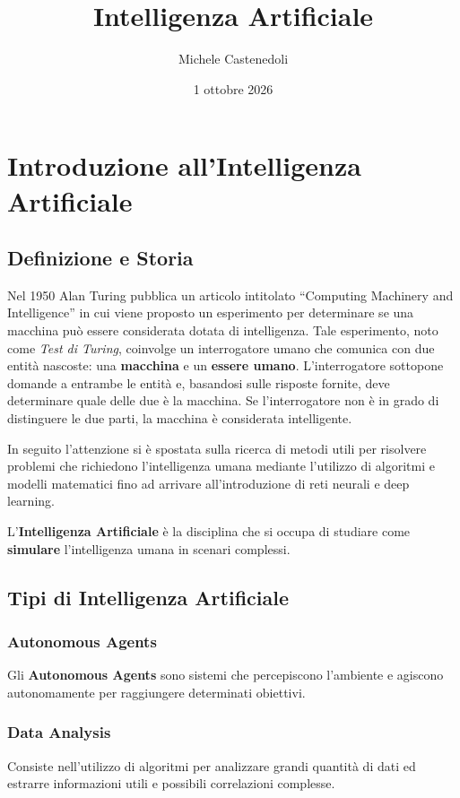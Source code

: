 \documentclass[a4paper, 11pt, oneside]{book}
\title{Intelligenza Artificiale}
\author{Michele Castenedoli}
\date{1 ottobre 2026}
\theoremstyle{definition}
\begin{document}
	\maketitle

	\tableofcontents

	\chapter{Introduzione all'Intelligenza Artificiale}
	\section{Definizione e Storia}
	Nel 1950 Alan Turing pubblica un articolo intitolato ``Computing Machinery and
	Intelligence'' in cui viene proposto un esperimento per determinare se una
	macchina pu\`o essere considerata dotata di intelligenza. Tale esperimento,
	noto come \emph{Test di Turing}, coinvolge un interrogatore umano che comunica
	con due entit\`a nascoste: una \textbf{macchina} e un \textbf{essere umano}.
	L'interrogatore sottopone domande a entrambe le entit\`a e, basandosi sulle risposte
	fornite, deve determinare quale delle due \`e la macchina. Se l'interrogatore non \`e in
	grado di distinguere le due parti, la macchina \`e considerata intelligente.

	In seguito l'attenzione si \`e spostata sulla ricerca di metodi utili per
	risolvere problemi che richiedono l'intelligenza umana mediante l'utilizzo di
	algoritmi e modelli matematici fino ad arrivare all'introduzione di reti
	neurali e deep learning.

	\begin{definizione}
		 L'\textbf{Intelligenza Artificiale} \`e la disciplina
		che si occupa di studiare come \textbf{simulare} l'intelligenza umana in
		scenari complessi.
	\end{definizione}

	\section{Tipi di Intelligenza Artificiale}
	\subsection{Autonomous Agents}
	Gli \textbf{Autonomous Agents} sono sistemi che percepiscono l'ambiente e
	agiscono autonomamente per raggiungere determinati obiettivi.

	\subsection{Data Analysis}
	Consiste nell'utilizzo di algoritmi per analizzare grandi quantit\`a di dati
	ed estrarre informazioni utili e possibili correlazioni complesse.
\end{document}
